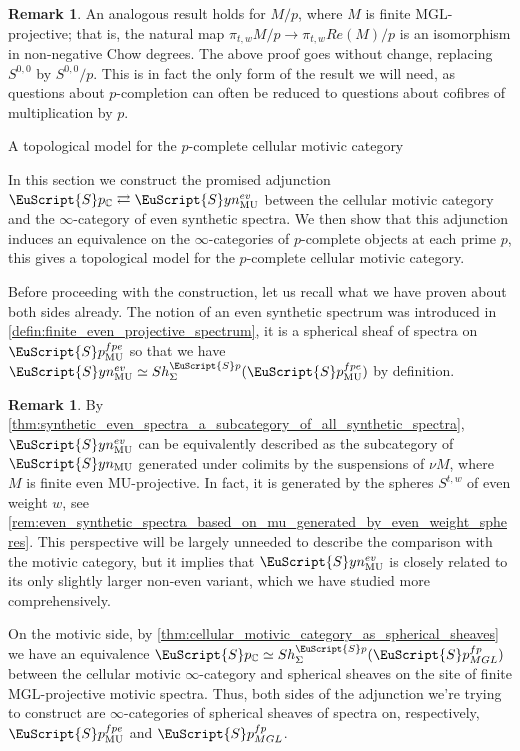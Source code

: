 \documentclass[oneside,a4paper]{amsart}
\makeatletter
\newcommand{\euscr}[1]{\EuScript{#1}} %
\newcommand{\MU}{\mathrm{MU}} %
\newcommand{\MGL}{\mathrm{MGL}} %
\newcommand{\spectra}{\euscr{S}p} %
\newcommand{\cspectra}{\euscr{S}p_{\mathbb{C}}} %
\newcommand{\synspectra}{\euscr{S}yn} %
\newcommand{\spectramglfp}{\spectra_{MGL}^{fp}} %
\newcommand{\spectramufpe}{\spectra_{\MU}^{fpe}} %
\theoremstyle{plain}
\theoremstyle{definition}
\newtheorem{rem}[thm]{Remark}
\theoremstyle{remark}
\def\subsection{\@startsection{subsection}{1}%
  \z@{.7\linespacing\@plus\linespacing}{.5\linespacing}%
  {\normalfont\bfseries\centering}}%
\makeatother
\begin{document}
\begin{rem}
\label{rem:gheorghe_isaksen_also_holds_mod_p}
An analogous result holds for $M / p$, where $M$ is finite $\MGL$-projective; that is, the natural map $\pi_{t, w} M / p \rightarrow \pi_{t, w} Re(M) / p$ is an isomorphism in non-negative Chow degrees. The above proof goes without change, replacing $S^{0, 0}$ by $S^{0, 0} / p$. This is in fact the only form of the result we will need, as questions about $p$-completion can often be reduced to questions about cofibres of multiplication by $p$. 
\end{rem}

\subsection{A topological model for the $p$-complete cellular motivic category} 

In this section we construct the promised adjunction $\cspectra \rightleftarrows \synspectra_{\MU}^{ev}$ between the cellular motivic category and the $\infty$-category of even synthetic spectra. We then show that this adjunction induces an equivalence on the $\infty$-categories of $p$-complete objects at each prime $p$, this gives a topological model for the $p$-complete cellular motivic category. 

Before proceeding with the construction, let us recall what we have proven about both sides already. The notion of an even synthetic spectrum was introduced in \cref{defin:finite_even_projective_spectrum}, it is a spherical sheaf of spectra on $\spectramufpe$ so that we have $\synspectra_{\MU}^{ev} \simeq Sh_{\Sigma}^{\spectra}(\spectramufpe)$ by definition. 

\begin{rem}
By \cref{thm:synthetic_even_spectra_a_subcategory_of_all_synthetic_spectra}, $\synspectra_{\MU}^{ev}$ can be equivalently described as the subcategory of $\synspectra_{\MU}$ generated under colimits by the suspensions of $\nu M$, where $M$ is finite even $\MU$-projective. In fact, it is generated by the spheres $S^{t, w}$ of even weight $w$, see \cref{rem:even_synthetic_spectra_based_on_mu_generated_by_even_weight_spheres}. This perspective will be largely unneeded to describe the comparison with the motivic category, but it implies that $\synspectra_{\MU}^{ev}$ is closely related to its only slightly larger non-even variant, which we have studied more comprehensively.
\end{rem}

On the motivic side, by \cref{thm:cellular_motivic_category_as_spherical_sheaves} we have an equivalence $\cspectra \simeq Sh_{\Sigma}^{\spectra}(\spectramglfp)$ between the cellular motivic $\infty$-category and spherical sheaves on the site of finite $\MGL$-projective motivic spectra. Thus, both sides of the adjunction we're trying to construct are $\infty$-categories of spherical sheaves of spectra on, respectively, $\spectramufpe$ and $\spectramglfp$. 
\end{document}
